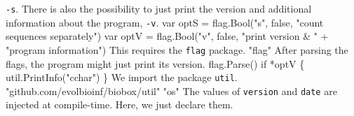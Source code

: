 \texttt{-s}. There is also the possibility to just print the version
and additional information about the program, \texttt{-v}.
\nwenddocs{}\endmoddef\nwstartdeflinemarkup{}\nwenddeflinemarkup
var optS = flag.Bool("s", false, "count sequences separately")
var optV = flag.Bool("v", false, "print version & " +
          "program information")
\nwendcode{}\nwdocspar
This requires the \texttt{flag} package.
\nwenddocs{}\plusendmoddef\nwstartdeflinemarkup{}\nwenddeflinemarkup
"flag"
\nwendcode{}\nwdocspar
After parsing the flags, the program might just print
its version.
\nwenddocs{}\endmoddef\nwstartdeflinemarkup{}\nwenddeflinemarkup
flag.Parse()
if *optV \{
          util.PrintInfo("cchar")
\}
\nwendcode{}\nwdocspar
We import the package \texttt{util}.
\nwenddocs{}\plusendmoddef\nwstartdeflinemarkup{}\nwenddeflinemarkup
"github.com/evolbioinf/biobox/util"
"os"
\nwendcode{}\nwdocspar
The values of \texttt{version} and \texttt{date} are injected at
compile-time. Here, we just declare them.
\nwenddocs{}\plusendmoddef\nwstartdeflinemarkup{}\nwenddeflinemarkup
